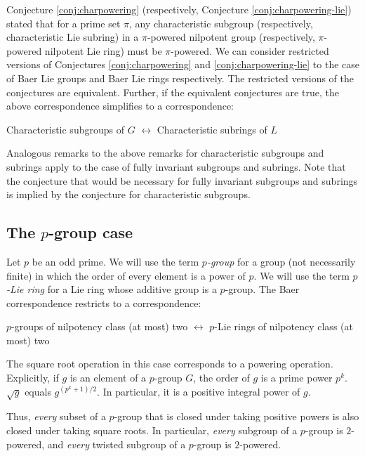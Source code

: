 \documentclass{ucetd}
\begin{document}
Conjecture \ref{conj:charpowering} (respectively, Conjecture
\ref{conj:charpowering-lie}) stated that for a prime set $\pi$, any
characteristic subgroup (respectively, characteristic Lie subring) in
a $\pi$-powered nilpotent group (respectively, $\pi$-powered nilpotent
Lie ring) must be $\pi$-powered. We can consider restricted versions
of Conjectures \ref{conj:charpowering} and \ref{conj:charpowering-lie}
to the case of Baer Lie groups and Baer Lie rings respectively. The
restricted versions of the conjectures are equivalent. Further, if the
equivalent conjectures are true, the above correspondence simplifies
to a correspondence:

\begin{center}
  Characteristic subgroups of $G$ $\leftrightarrow$ Characteristic
  subrings of $L$
\end{center}

Analogous remarks to the above remarks for characteristic subgroups
and subrings apply to the case of fully invariant subgroups and
subrings. Note that the conjecture that would be necessary for fully
invariant subgroups and subrings is implied by the conjecture for
characteristic subgroups.


\subsection{The $p$-group case}\label{sec:baer-p-group-case}

Let $p$ be an odd prime. We will use the term {\em $p$-group} for a
group (not necessarily finite) in which the order of every element is
a power of $p$. We will use the term {\em $p$-Lie ring} for a Lie ring
whose additive group is a $p$-group. The Baer correspondence restricts
to a correspondence:

\begin{center}
  $p$-groups of nilpotency class (at most) two $\leftrightarrow$ $p$-Lie rings of nilpotency class (at most) two
\end{center}

The square root operation in this case corresponds to a powering
operation. Explicitly, if $g$ is an element of a $p$-group $G$, the
order of $g$ is a prime power $p^k$. $\sqrt{g}$ equals $g^{(p^k +
  1)/2}$. In particular, it is a positive integral power of $g$.

Thus, {\em every} subset of a $p$-group that is closed under taking
positive powers is also closed under taking square roots. In
particular, {\em every} subgroup of a $p$-group is $2$-powered, and
{\em every} twisted subgroup of a $p$-group is $2$-powered.
\end{document}
